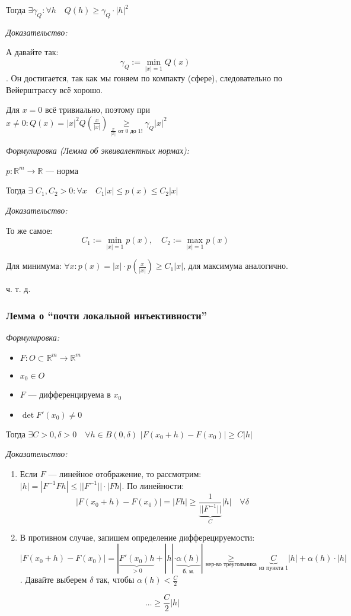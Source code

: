 \documentclass{article}
\def\dbl{\,\,}
\begin{document}
Тогда $\exists \gamma_Q: \forall h \quad Q(h) \ge \gamma_Q \cdot |h|^2$

\textit{Доказательство:}

А давайте так: $$\gamma_Q := \min_{|x| = 1}{Q(x)}$$. Он достигается, так как мы гоняем по компакту (сфере), следовательно по Вейерштрассу всё хорошо.

Для $x = 0$ всё тривиально, поэтому при $x \neq 0: Q(x) = |x|^2Q(\frac{x}{|x|}) \underset{\frac{x}{|x|}\text{ от 0 до 1!}}{\ge} \gamma_Q|x|^2$

\textit{Формулировка (Лемма об эквивалентных нормах):}

$p: \mathbb{R}^m \rightarrow \mathbb{R}$ --- норма

Тогда $\exists \dbl C_1, C_2 > 0: \forall x \quad C_1|x| \le p(x) \le C_2|x|$

\textit{Доказательство:}

То же самое: $$C_1 := \min_{|x| = 1}{p(x)}, \quad C_2 := \max_{|x| = 1}{p(x)}$$

Для минимума: $\forall x: p(x) = |x| \cdot p(\frac{x}{|x|}) \ge C_1|x|$, для максимума аналогично.

ч. т. д.

\subsubsection{Лемма о ``почти локальной инъективности''}
\textit{Формулировка:}

\begin{itemize}
    \item $F: O \subset \mathbb{R}^m \rightarrow \mathbb{R}^m$
    \item $x_0 \in O$
    \item $F$ --- дифференцируема в $x_0$
    \item $\det F'(x_0) \neq 0 $
\end{itemize}

Тогда $\exists C > 0, \delta > 0 \quad \forall h \in B(0, \delta) \dbl |F(x_0 + h) - F(x_0)| \ge C|h|$

\textit{Доказательство:}

\begin{enumerate}
    \item Если $F$ --- линейное отображение, то рассмотрим: $|h| = |F^{-1}Fh| \le ||F^{-1}|| \cdot |Fh|$. По линейности: 
    \[|F(x_0 + h) - F(x_0)| = |Fh| \ge \underbrace{\frac{1}{||F^{-1}||}}_{C}|h| \quad \forall \delta\]
    \item В противном случае, запишем определение дифферецируемости: $|F(x_0 + h) - F(x_0)| = |\underbrace{F'(x_0)h}_{> 0} + |h| \cdot \underbrace{\alpha(h)}_{\text{б. м.}}| \underset{\text{нер-во треугольника}}{\ge} \underbrace{C}_{\text{из пункта 1}}|h| + \alpha(h) \cdot |h|$. Давайте выберем $\delta$ так, чтобы $\alpha(h) < \frac{C}{2}$
    
    \[\ldots\ge \frac{C}{2}|h|\]
\end{enumerate}
\end{document}
